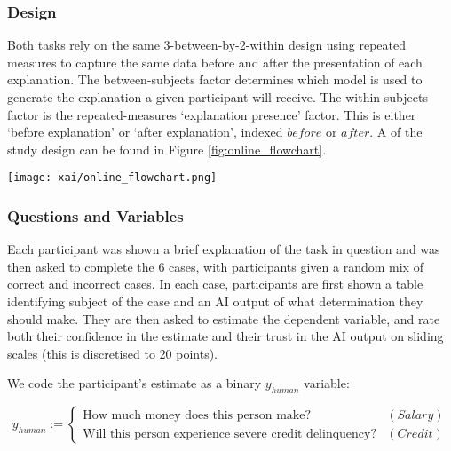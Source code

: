 \subsubsection{Design}
Both tasks rely on the same 3-between-by-2-within design using repeated measures to capture the same data before and after the presentation of each explanation. The between-subjects factor determines which model is used to generate the explanation a given participant will receive. The within-subjects factor is the repeated-measures `explanation presence' factor. This is either `before explanation' or `after explanation', indexed $before$ or $after$. A of the study design can be found in Figure \ref{fig:online_flowchart}.

\begin{figure*}[htbp]
    \centering
    \texttt{[image: xai/online\_flowchart.png]}
    \caption{Participants in the online study are sorted into six buckets, where each bucket is segregated by explanatory condition and task and shown a brief description of the task (i.e., each participant sees only one of the explanations in Figure \ref{fig:online_explanations}). Then, each participant is shown 6 cases. In each case, participants are shown an applicant profile and a AI output. Participants are asked to agree or disagree with the AI output. Then, participants are given explanations based on their explanatory condition scores. They are then asked again to agree or disagree with the AI output.}
    \label{fig:online_flowchart}
\end{figure*}

\subsubsection{Questions and Variables}\label{sssec:q_and_v}
Each participant was shown a brief explanation of the task in question and was then asked to complete the 6 cases, with participants given a random mix of correct and incorrect cases. In each case, participants are first shown a table identifying subject of the case and an AI output of what determination they should make. They are then asked to estimate the dependent variable, and rate both their confidence in the estimate and their trust in the AI output on sliding scales (this is discretised to 20 points).

We code the participant's estimate as a binary $y_{human}$ variable:

\begin{equation}
    y_{human} := \begin{cases}
        \text{How much money does this person make?} & (Salary) \\
        \text{Will this person experience severe credit delinquency?} & (Credit)
    \end{cases}
\end{equation}

